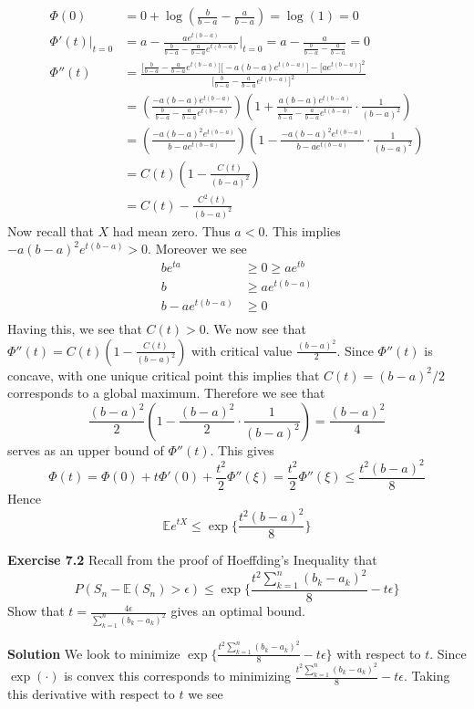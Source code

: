 \documentclass[12pt]{article}  %
\newcommand{\e}{{\epsilon}}
\newcommand{\E}{{\mathbb{E}}}
\begin{document}
\begin{align*}
\Phi(0) &= 0 + \log\left(\frac{b}{b-a} - \frac{a}{b-a}\right) = \log(1) = 0 \\
\Phi'(t)\big\vert_{t=0} &= a  - \frac{ae^{t(b-a)}}{\frac{b}{b-a} - \frac{a}{b-a}e^{t(b-a)}}\Big\vert_{t=0} = a - \frac{a}{\frac{b}{b-a}-\frac{a}{b-a}} = 0 \\
\Phi''(t) &= \frac{\Big[\frac{b}{b-a} - \frac{a}{b-a}e^{t(b-a)}\Big]\Big[-a(b-a)e^{t(b-a)}\Big]-\Big[ae^{t(b-a)}\Big]^2}{\Big[\frac{b}{b-a}-\frac{a}{b-a}e^{t(b-a)}\Big]^2}\\
&= \left(\frac{-a(b-a)e^{t(b-a)}}{\frac{b}{b-a}-\frac{a}{b-a}e^{t(b-a)}}\right)\left(1 + \frac{a(b-a)e^{t(b-a)}}{\frac{b}{b-a}-\frac{a}{b-a}e^{t(b-a)}}\cdot\frac{1}{(b-a)^2}\right)\\
&= \left(\frac{-a(b-a)^2e^{t(b-a)}}{b-ae^{t(b-a)}}\right)\left(1-\frac{-a(b-a)^2e^{t(b-a)}}{b-ae^{t(b-a)}}\cdot\frac{1}{(b-a)^2}\right)\\
&= C(t)\left(1-\frac{C(t)}{(b-a)^2}\right)\\
&= C(t) - \frac{C^2(t)}{(b-a)^2}
\end{align*}
Now recall that $X$ had mean zero. Thus $a<0$. This implies $-a(b-a)^2e^{t(b-a)}>0$. Moreover we see 
\begin{align*}
be^{ta}&\geq 0 \geq ae^{tb}\\
b &\geq ae^{t(b-a)}\\
b - ae^{t(b-a)} &\geq 0\\
\end{align*}
Having this, we see that $C(t)>0$. We now see that $\Phi''(t) = C(t)(1-\frac{C(t)}{(b-a)^2})$ with critical value $\frac{(b-a)^2}{2}$. Since $\Phi''(t)$ is concave, with one unique critical point this implies that $C(t) = (b-a)^2/2$ corresponds to a global maximum. Therefore we see that $$\frac{(b-a)^2}{2}\left(1 - \frac{(b-a)^2}{2}\cdot\frac{1}{(b-a)^2}\right) = \frac{(b-a)^2}{4}$$serves as an upper bound of $\Phi''(t)$. This gives $$\Phi(t) = \Phi(0) + t\Phi'(0) + \frac{t^2}{2}\Phi''(\xi) = \frac{t^2}{2}\Phi''(\xi)\leq \frac{t^2(b-a)^2}{8}$$
Hence $$\E e^{tX} \leq \exp\Big\{\frac{t^2(b-a)^2}{8}\Big\}$$

\newpage

\textbf{Exercise 7.2} Recall from the proof of Hoeffding's Inequality that $$P(S_n - \E(S_n)>\e)\leq \exp\Big\{\frac{t^2\sum_{k=1}^{n}(b_k -a_k)^2}{8} - t\e\Big\}$$
Show that $t = \frac{4\e}{\sum_{k=1}^{n}(b_k - a_k)^2}$ gives an optimal bound. 

\textbf{Solution} We look to minimize $\exp\Big\{\frac{t^2\sum_{k=1}^{n}(b_k -a_k)^2}{8} - t\e\Big\}$ with respect to $t$. Since $\exp(\cdot)$ is convex this corresponds to minimizing $\frac{t^2\sum_{k=1}^{n}(b_k -a_k)^2}{8} - t\e$. Taking this derivative with respect to $t$ we see 
\end{document}
